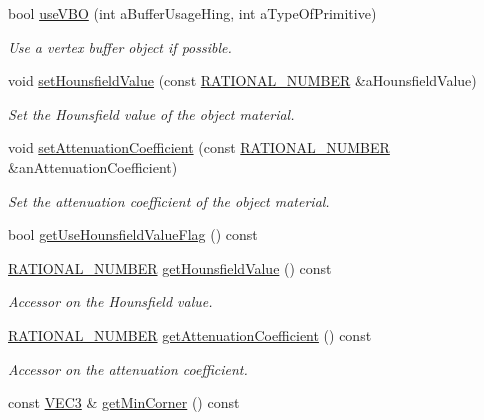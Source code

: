 \begin{DoxyCompactItemize}
bool \hyperlink{class_graphics_1_1_triangle_mesh_ae6175477fb00bba71f4c75b79834a4f8}{useVBO} (int aBufferUsageHing, int aTypeOfPrimitive)
\begin{DoxyCompactList}\small\item\em Use a vertex buffer object if possible. \end{DoxyCompactList}\item 
void \hyperlink{class_graphics_1_1_triangle_mesh_affd0f454aa16d4b88046b5cbb0903f07}{setHounsfieldValue} (const \hyperlink{namespace_utilities_a40969b96bd8d847b962e297cb79f08ce}{RATIONAL\_\-NUMBER} \&aHounsfieldValue)
\begin{DoxyCompactList}\small\item\em Set the Hounsfield value of the object material. \end{DoxyCompactList}\item 
void \hyperlink{class_graphics_1_1_triangle_mesh_a7e8b31767d359a376e93050a4223ca96}{setAttenuationCoefficient} (const \hyperlink{namespace_utilities_a40969b96bd8d847b962e297cb79f08ce}{RATIONAL\_\-NUMBER} \&anAttenuationCoefficient)
\begin{DoxyCompactList}\small\item\em Set the attenuation coefficient of the object material. \end{DoxyCompactList}\item 
bool \hyperlink{class_graphics_1_1_triangle_mesh_a6e278a61ead1cb3ad8b070f120d976ae}{getUseHounsfieldValueFlag} () const 
\item 
\hyperlink{namespace_utilities_a40969b96bd8d847b962e297cb79f08ce}{RATIONAL\_\-NUMBER} \hyperlink{class_graphics_1_1_triangle_mesh_a37ee91764ef3643de7d5b6664f9eafde}{getHounsfieldValue} () const 
\begin{DoxyCompactList}\small\item\em Accessor on the Hounsfield value. \end{DoxyCompactList}\item 
\hyperlink{namespace_utilities_a40969b96bd8d847b962e297cb79f08ce}{RATIONAL\_\-NUMBER} \hyperlink{class_graphics_1_1_triangle_mesh_a93fdf84e7b029f19345d4005fe8cb868}{getAttenuationCoefficient} () const 
\begin{DoxyCompactList}\small\item\em Accessor on the attenuation coefficient. \end{DoxyCompactList}\item 
const \hyperlink{class_math_1_1_vec3}{VEC3} \& \hyperlink{class_graphics_1_1_triangle_mesh_a8b75cac9817870e3f7ade5363a9e5662}{getMinCorner} () const 

\end{DoxyCompactItemize}
